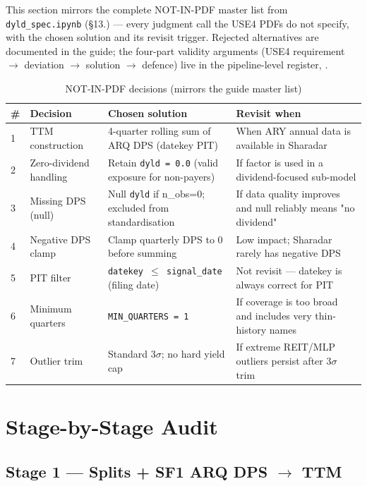 \documentclass[11pt,a4paper]{article}
\begin{document}
This section mirrors the complete NOT-IN-PDF master list from
\texttt{dyld\_spec.ipynb} (\S13.) --- every judgment call the USE4 PDFs do not
specify, with the chosen solution and its revisit trigger. Rejected alternatives
are documented in the guide; the four-part validity arguments (USE4 requirement
$\to$ deviation $\to$ solution $\to$ defence) live in the pipeline-level
register, .

\begin{longtable}{@{}p{0.5cm}p{3.6cm}p{6.0cm}p{3.8cm}@{}}
\caption{NOT-IN-PDF decisions (mirrors the guide master list)}\\
\toprule
\textbf{\#} & \textbf{Decision} & \textbf{Chosen solution} & \textbf{Revisit when} \\
\midrule
\endhead
1 & TTM construction & 4-quarter rolling sum of ARQ DPS (datekey PIT) & When ARY annual data is available in Sharadar \\[3pt]
2 & Zero-dividend handling & Retain \texttt{dyld = 0.0} (valid exposure for non-payers) & If factor is used in a dividend-focused sub-model \\[3pt]
3 & Missing DPS (null) & Null \texttt{dyld} if n\_obs=0; excluded from standardisation & If data quality improves and null reliably means "no dividend" \\[3pt]
4 & Negative DPS clamp & Clamp quarterly DPS to 0 before summing & Low impact; Sharadar rarely has negative DPS \\[3pt]
5 & PIT filter & \texttt{datekey $\leq$ signal\_date} (filing date) & Not revisit --- datekey is always correct for PIT \\[3pt]
6 & Minimum quarters & \texttt{MIN\_QUARTERS = 1} & If coverage is too broad and includes very thin-history names \\[3pt]
7 & Outlier trim & Standard 3$\sigma$; no hard yield cap & If extreme REIT/MLP outliers persist after 3$\sigma$ trim \\[3pt]
\bottomrule
\end{longtable}

\section{Stage-by-Stage Audit}

\subsection{Stage 1 --- Splits + SF1 ARQ DPS $\to$ TTM}
\end{document}

